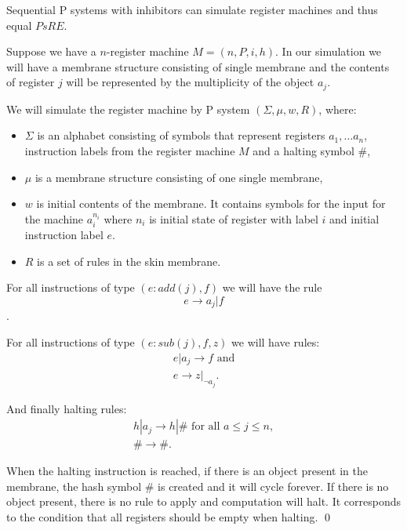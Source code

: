 \begin{veta}
  Sequential P systems with inhibitors can simulate register machines and thus equal $PsRE$.
\end{veta}


\begin{dokaz}
\label{proof:reg_by_inh}
  Suppose we have a $n$-register machine $M = (n,P,i,h)$. In our simulation we will have a membrane structure consisting of single membrane and the contents of register $j$ will be represented by the multiplicity of the object $a_j$.

  We will simulate the register machine by P system $(\Sigma, \mu, w, R)$, where:
  \begin{itemize}
    \item $\Sigma$ is an alphabet consisting of symbols that represent registers $a_1,\dots a_n$, instruction labels from the register machine $M$ and a halting symbol $\#$,
    \item $\mu$ is a membrane structure consisting of one single membrane,
    \item $w$ is initial contents of the membrane. It contains symbols for the input for the machine $a_i^{n_i}$ where $n_i$ is initial state of register with label $i$ and initial instruction label $e$.
    \item $R$ is a set of rules in the skin membrane.
  \end{itemize}
    
  For all instructions of type $(e : add(j), f)$ we will have the rule $$e \rightarrow a_j|f$$.

  For all instructions of type $(e : sub(j), f, z)$ we will have rules:
  \begin{align*}
    e|a_j \rightarrow f\text{~and}\\
    e \rightarrow z|_{\neg a_j}.
  \end{align*}

  And finally halting rules:
  \begin{align*}
    h|a_j \rightarrow h|\#\text{~for all~}a\leq j\leq n,\\
    \# \rightarrow \#.
  \end{align*}

  When the halting instruction is reached, if there is an object present in the membrane, the hash symbol $\#$ is created and it will cycle forever. If there is no object present, there is no rule to apply and computation will halt. It corresponds to the condition that all registers should be empty when halting. \qed
\end{dokaz}